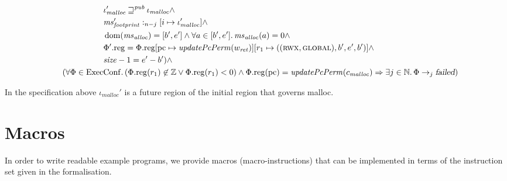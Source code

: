 \documentclass[a4paper]{article}
\newcommand{\update}[2]{[#1 \mapsto #2]}
\DeclareMathOperator{\dom}{dom}
\newcommand\lau[1]{{\color{purple} \sf \footnotesize {LS: #1}}\\}
\newcommand\dominique[1]{{\color{purple} \sf \footnotesize {DD: #1}}\\}
\renewcommand\lau[1]{}
\renewcommand\dominique[1]{}
\newcommand{\var}[1]{\mathit{#1}}
\newcommand{\hs}{\var{ms}}
\newcommand{\ms}{\hs}
\newcommand{\pcreg}{\mathrm{pc}}
\newcommand{\heap}{\var{mem}}
\newcommand{\plainproj}[1]{\mathrm{#1}}
\newcommand{\memreg}[1][\Phi]{#1.\plainproj{reg}}
\newcommand{\failed}{\textsl{failed}}
\newcommand{\plainfun}[2]{
  \ifthenelse{\equal{#2}{}}
  {\mathit{#1}}
  {\mathit{#1}(#2)}
}
\newcommand{\updatePcPerm}[1]{\plainfun{updatePcPerm}{#1}}
\newcommand{\futurewk}{\mathbin{\sqsupseteq}^{\var{pub}}}
\newcommand{\heapSat}[3][\heap]{#1 :_{#2} #3}
\newcommand{\codelabel}[1]{\mathit{#1}}
\newcommand{\malloc}{\codelabel{malloc}}
\newcommand{\plaindom}[1]{\mathrm{#1}}
\newcommand{\ExecConfs}{\plaindom{ExecConf}}
\newcommand{\nats}{\mathbb{N}}
\newcommand{\ints}{\mathbb{Z}}
\newcommand{\plainperm}[1]{\textsc{#1}}
\newcommand{\rwx}{\plainperm{rwx}}
\newcommand{\glob}{\plainperm{global}}
\newcommand{\step}[1][]{\rightarrow_{#1}}
\begin{document}
\begin{specification}
\[\begin{aligned}
                    &\qquad \qquad \qquad \iota_{\malloc}' \futurewk \iota_\malloc \land \\
                    &\qquad \qquad \qquad \heapSat[\ms_{\var{footprint}}']{n-j}{[i \mapsto \iota_\malloc']} \land \\
                    &\qquad \qquad \qquad \dom(\hs_{\var{alloc}}) = [b',e'] \land \forall a \in [b',e']\ldotp \hs_{\var{alloc}}(a) = 0  \land \\
                    &\qquad \qquad \qquad \memreg[\Phi'] = \memreg[\Phi]\update{\pcreg}{\updatePcPerm{w_{\var{ret}}}}\update{r_1}{((\rwx,\glob),b',e',b')} \land \\
                    &\qquad \qquad \qquad \size - 1 = e'-b' ) \land\\
                    &\quad (\forall \Phi \in \ExecConfs \ldotp (\memreg(r_1)
                    \not\in \ints \vee \memreg(r_1) < 0) \land \memreg(\pcreg) = \updatePcPerm{c_\malloc} \Rightarrow \exists j \in \nats \ldotp \Phi \step[j] \failed)
                  \end{aligned}
                \]
              \end{specification}
              In the specification above $\iota_\malloc'$ is a future region of the initial region that governs malloc.
              \lau{What about $c_\malloc$ and the value relation? Do we add this to the specification or try to prove it based on the specification?}

              \section{Macros}
              In order to write readable example programs, we provide macros (macro-instructions) that can be implemented in terms of the instruction set given in the formalisation.
              \dominique{Similarly: how is malloc invoked?  Do we trust malloc enough to not encapsulate ourselves from it, i.e. provide an rx return capability and use callee-save registers?}
              \lau{ I think this is a conceptual question as we can make it work with either. We already trust malloc to give us a fresh piece of memory and not reuse it later on, so we already assume malloc to be somewhat trusted, so why not go all the way? }
              \lau{Agreed.}

              \dominique{what does ``fetch the capability ...'' mean?}
              \lau{ We don't know where the capability resides, but if it is in memory, then it will be loaded into a register. }
              \dominique{Wouldn't it be more clear to provide call with two explicit lists of registers: those which need to be stored, and those which are provided as arguments (i.e. which do not need to be erased)?}
              \dominique{Perhaps you could also provide an explicit syntax for ``undefined symbols'' that should be filled in by a linker?}
\end{document}
